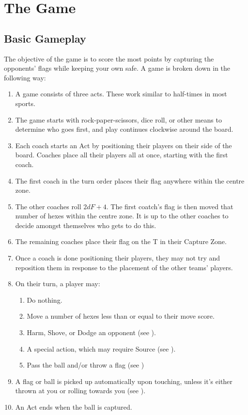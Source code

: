 \chapter{The Game}
\section{Basic Gameplay} \label{basic-gameplay}
The objective of the game is to score the most points by capturing the opponents' flags while keeping your own safe.
A game is broken down in the following way:
\begin{enumerate}
    \item A game consists of three acts.
    These work similar to half-times in most sports.
    \item The game starts with rock-paper-scissors, dice roll, or other means to determine who goes first, and play continues clockwise around the board.
    \item Each coach starts an Act by positioning their players on their side of the board.
    Coaches place all their players all at once, starting with the first coach.
    \item The first coach in the turn order places their flag anywhere within the centre zone.
    \item The other coaches roll $2dF+4$. The first coatch's flag is then moved that number of hexes within the centre zone.
    It is up to the other coaches to decide amongst themselves who gets to do this.
    \item The remaining coaches place their flag on the T in their Capture Zone.
    \item Once a coach is done positioning their players, they may not try and reposition them in response to the placement of the other teams' players.
    \item On their turn, a player may:
    \begin{enumerate}
        \item Do nothing.
        \item Move a number of hexes less than or equal to their move score.
        \item Harm, Shove, or Dodge an opponent (see ).
        \item A special action, which may require Source (see ).
        \item Pass the ball and/or throw a flag (see )
    \end{enumerate}
    \item A flag or ball is picked up automatically upon touching, unless it’s either thrown at you or rolling towards you (see ).
    \item An Act ends when the ball is captured.
\end{enumerate}




% 



